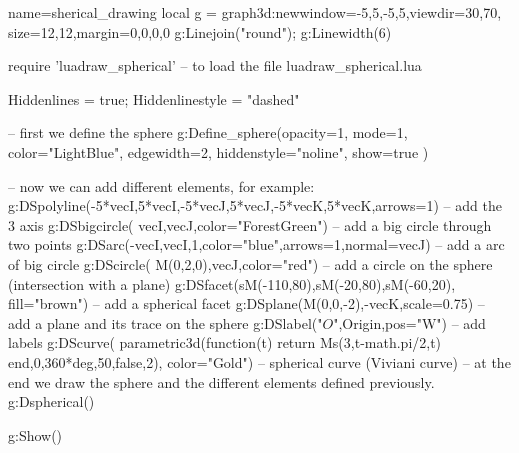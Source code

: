 \documentclass[12pt]{standalone}
\begin{document}
\begin{luadraw}{name=sherical_drawing}
local g = graph3d:new{window={-5,5,-5,5},viewdir={30,70}, size={12,12},margin={0,0,0,0}}
g:Linejoin("round"); g:Linewidth(6)

require 'luadraw_spherical'  -- to load the file luadraw_spherical.lua

Hiddenlines = true; Hiddenlinestyle = "dashed"

-- first  we define the sphere
g:Define_sphere({opacity=1, mode=1, color="LightBlue", edgewidth=2, hiddenstyle="noline", show=true} )

-- now we can add different elements, for example:
g:DSpolyline({{-5*vecI,5*vecI},{-5*vecJ,5*vecJ},{-5*vecK,5*vecK}},{arrows=1}) -- add the 3 axis
g:DSbigcircle( {vecI,vecJ},{color="ForestGreen"}) -- add a big circle through two points
g:DSarc(-vecI,vecI,1,{color="blue",arrows=1,normal=vecJ}) -- add a arc of big circle
g:DScircle( {M(0,2,0),vecJ},{color="red"}) -- add a circle on the sphere (intersection with a plane)
g:DSfacet({sM(-110,80),sM(-20,80),sM(-60,20)}, {fill="brown"}) -- add a spherical facet
g:DSplane({M(0,0,-2),-vecK},{scale=0.75})  -- add a plane and its trace on the sphere
g:DSlabel("$O$",Origin,{pos="W"}) -- add labels
g:DScurve( parametric3d(function(t) return Ms(3,t-math.pi/2,t) end,0,360*deg,50,false,2), {color="Gold"}) -- spherical curve (Viviani curve)
-- at the end we draw the sphere and the different elements defined previously.
g:Dspherical()

g:Show()
\end{luadraw}
\end{document}
